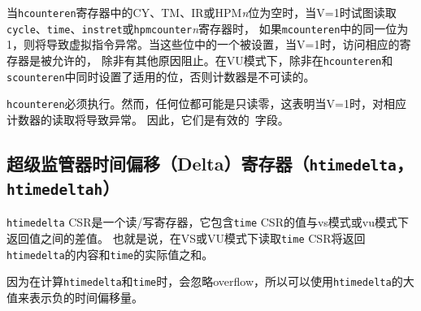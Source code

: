 当{\tt hcounteren}寄存器中的CY、TM、IR或HPM{\em n}位为空时，当V=1时试图读取{\tt cycle}、{\tt time}、{\tt instret}或{\tt hpmcounter}{\em n}寄存器时，
如果{\tt mcounteren}中的同一位为1，则将导致虚拟指令异常。当这些位中的一个被设置，当V=1时，访问相应的寄存器是被允许的，
除非有其他原因阻止。在VU模式下，除非在{\tt hcounteren}和{\tt scounteren}中同时设置了适用的位，否则计数器是不可读的。

{\tt hcounteren}必须执行。然而，任何位都可能是只读零，这表明当V=1时，对相应计数器的读取将导致异常。
因此，它们是有效的\warl\ 字段。

\subsection{超级监管器时间偏移（Delta）寄存器（{\tt htimedelta}， {\tt htimedeltah}）
  }

{\tt htimedelta} CSR是一个读/写寄存器，它包含{\tt time} CSR的值与vs模式或vu模式下返回值之间的差值。
也就是说，在VS或VU模式下读取{\tt time} CSR将返回{\tt htimedelta}的内容和{\tt time}的实际值之和。

\begin{commentary}
  因为在计算{\tt htimedelta}和{\tt time}时，会忽略overflow，所以可以使用{\tt htimedelta}的大值来表示负的时间偏移量。
\end{commentary}

